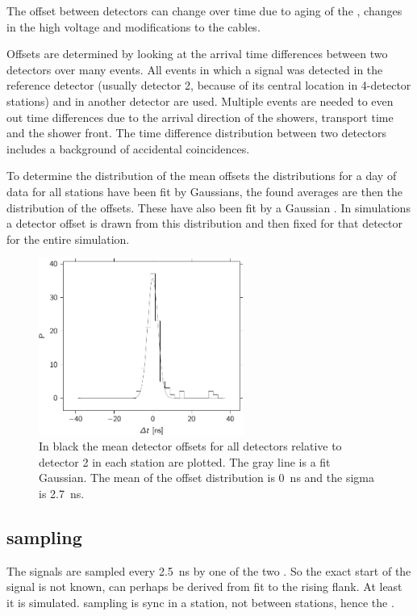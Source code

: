 The offset between detectors can change over time due to aging of the
\pmt, changes in the high voltage and modifications to the cables.

Offsets are determined by looking at the arrival time differences
between two detectors over many events. All events in which a signal was
detected in the reference detector (usually detector 2, because of its
central location in 4-detector stations) and in another detector are
used. Multiple events are needed to even out time differences due to the
arrival direction of the showers, transport time and the shower front.
The time difference distribution between two detectors includes a
background of accidental coincidences.

To determine the distribution of the mean offsets the distributions for
a day of data for all stations have been fit by Gaussians, the found
averages are then the distribution of the offsets. These have also been
fit by a Gaussian . In
simulations a detector offset is drawn from this distribution and then
fixed for that detector for the entire simulation.


\begin{figure}
    \centering
    \includegraphics[width=0.6\textwidth]{
        plots/response/detector_offset_distribution_20140101_d2.pdf}
    \caption{ In black the mean
             detector offsets for all detectors relative to detector 2
             in each station are plotted. The gray line is a fit
             Gaussian. The mean of the offset distribution is
             \SI{0}{\nano\second} and the sigma is
             \SI{2.7}{\nano\second}.}
    \label{fig:detector_offset_distribution}
\end{figure}


\subsection{\adc sampling}

The \pmt signals are sampled every \SI{2.5}{\nano\second} by one of the
two \adcs. So the exact start of the signal is not known, can perhaps be
derived from fit to the rising flank. At least it is simulated. sampling
is sync in a station, not between stations, hence the \gps.
